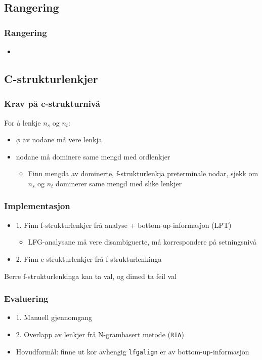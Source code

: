\documentclass[xcolor=x11names,compress,bigger]{beamer}
\renewcommand{\(}{\begin{columns}}
\renewcommand{\)}{\end{columns}}
\newcommand{\<}[1]{\begin{column}{#1}}
\renewcommand{\>}{\end{column}}
\begin{document}
\subsection{Rangering}
\begin{frame}\frametitle{Rangering}
  \begin{itemize}
  \item 
  \end{itemize}
\end{frame}

\subsection{C-strukturlenkjer}
\begin{frame}\frametitle{Krav på c-strukturnivå}
  For å lenkje $n_s$ og $n_t$:
  \begin{itemize}
  \item $\phi$ av nodane må vere lenkja
  \item nodane må dominere same mengd med ordlenkjer
    \begin{itemize}
    \item Finn mengda av dominerte, f-strukturlenkja preterminale
      nodar, sjekk om $n_s$ og $n_t$ dominerer same mengd med slike
      lenkjer
    \end{itemize}
  \end{itemize}
\end{frame}


\begin{frame}\frametitle{Implementasjon}
  \begin{itemize}
  \item 1. Finn f-strukturlenkjer frå analyse + bottom-up-informasjon (LPT)
    \begin{itemize}
    \item LFG-analysane må vere disambiguerte, må korrespondere på setningsnivå 
    \end{itemize}
  \item 2. Finn c-strukturlenkjer frå f-strukturlenkinga
  \end{itemize}

  Berre f-strukturlenkinga kan ta val, og dimed ta feil val
\end{frame}


\begin{frame}\frametitle{Evaluering}
  \begin{itemize}
  \item 1. Manuell gjennomgang
  \item 2. Overlapp av lenkjer frå N-grambasert metode (\texttt{RIA})
  \item Hovudformål: finne ut kor avhengig \texttt{lfgalign} er av
    bottom-up-informasjon
  \end{itemize}
\end{frame}
\end{document}

